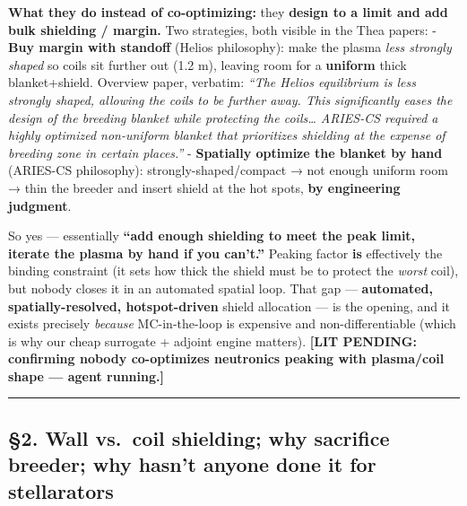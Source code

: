 \documentclass[
]{article}
\begin{document}
\textbf{What they do instead of co-optimizing:} they \textbf{design to a
limit and add bulk shielding / margin.} Two strategies, both visible in
the Thea papers: - \textbf{Buy margin with standoff} (Helios
philosophy): make the plasma \emph{less strongly shaped} so coils sit
further out (1.2 m), leaving room for a \textbf{uniform} thick
blanket+shield. Overview paper, verbatim: \emph{``The Helios equilibrium
is less strongly shaped, allowing the coils to be further away. This
significantly eases the design of the breeding blanket while protecting
the coils\ldots{} ARIES-CS required a highly optimized non-uniform
blanket that prioritizes shielding at the expense of breeding zone in
certain places.''} - \textbf{Spatially optimize the blanket by hand}
(ARIES-CS philosophy): strongly-shaped/compact → not enough uniform room
→ thin the breeder and insert shield at the hot spots, \textbf{by
engineering judgment}.

So yes --- essentially \textbf{``add enough shielding to meet the peak
limit, iterate the plasma by hand if you can't.''} Peaking factor
\textbf{is} effectively the binding constraint (it sets how thick the
shield must be to protect the \emph{worst} coil), but nobody closes it
in an automated spatial loop. That gap --- \textbf{automated,
spatially-resolved, hotspot-driven} shield allocation --- is the
opening, and it exists precisely \emph{because} MC-in-the-loop is
expensive and non-differentiable (which is why our cheap surrogate +
adjoint engine matters). \textbf{{[}LIT PENDING: confirming nobody
co-optimizes neutronics peaking with plasma/coil shape --- agent
running.{]}}

\begin{center}\rule{0.5\linewidth}{0.5pt}\end{center}

\subsection{§2. Wall vs.~coil shielding; why sacrifice breeder; why
hasn't anyone done it for
stellarators}\label{wall-vs.-coil-shielding-why-sacrifice-breeder-why-hasnt-anyone-done-it-for-stellarators}
\end{document}

